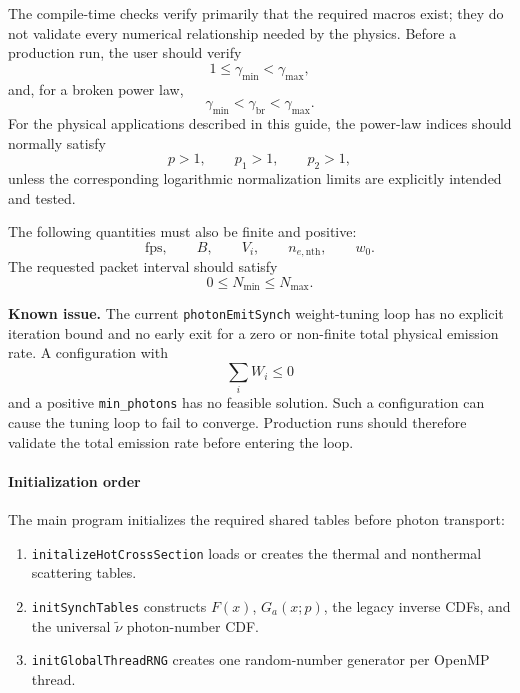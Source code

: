 \documentclass[12pt,a4paper]{article}
\newcommand{\code}[1]{\texttt{#1}}
\newenvironment{knownissue}{%
	\begin{framed}\noindent\textbf{Known issue.}\quad}
	{\end{framed}}
\begin{document}
The compile-time checks verify primarily that the required macros exist;
they do not validate every numerical relationship needed by the physics.
Before a production run, the user should verify
\begin{equation}
	1
	\le
	\gamma_{\min}
	<
	\gamma_{\max},
\end{equation}
and, for a broken power law,
\begin{equation}
	\gamma_{\min}
	<
	\gamma_{\mathrm{br}}
	<
	\gamma_{\max}.
\end{equation}
For the physical applications described in this guide, the power-law
indices should normally satisfy
\begin{equation}
	p>1,
	\qquad
	p_1>1,
	\qquad
	p_2>1,
\end{equation}
unless the corresponding logarithmic normalization limits are explicitly
intended and tested.

The following quantities must also be finite and positive:
\begin{equation}
	\mathrm{fps},
	\qquad
	B,
	\qquad
	V_i,
	\qquad
	n_{e,\mathrm{nth}},
	\qquad
	w_0.
\end{equation}
The requested packet interval should satisfy
\begin{equation}
	0
	\le
	N_{\min}
	\le
	N_{\max}.
\end{equation}

\begin{knownissue}
	The current \code{photonEmitSynch} weight-tuning loop has no explicit
	iteration bound and no early exit for a zero or non-finite total physical
	emission rate. A configuration with
	\begin{equation}
		\sum_iW_i
		\le
		0
	\end{equation}
	and a positive \code{min\_photons} has no feasible solution. Such a
	configuration can cause the tuning loop to fail to converge. Production
	runs should therefore validate the total emission rate before entering
	the loop.
\end{knownissue}

\paragraph{Initialization order}

The main program initializes the required shared tables before photon
transport:
\begin{enumerate}
	\item \code{initalizeHotCrossSection} loads or creates the thermal
	and nonthermal scattering tables.
	\item \code{initSynchTables} constructs \(F(x)\), \(G_a(x;p)\), the
	legacy inverse CDFs, and the universal
	\(\tilde{\nu}\) photon-number CDF.
	\item \code{initGlobalThreadRNG} creates one random-number generator
	per OpenMP thread.
\end{enumerate}
\end{document}
